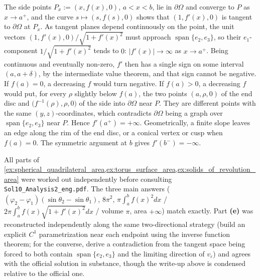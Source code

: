 \begin{exercisesolution}
\begin{enumerate}[label=\textbf{(\alph*)}]
    The side points $P_x := (x,f(x),0)$, $a<x<b$, lie in $\partial\Omega$ and converge to $P$ as
    $x \to a^+$, and the curve $s \mapsto (s,f(s),0)$ shows that $(1,f'(x),0)$ is tangent to
    $\partial\Omega$ at $P_x$. As tangent planes depend continuously on the point, the unit
    vectors $(1,f'(x),0)/\sqrt{1+f'(x)^2}$ must approach $\operatorname{span}\{e_2,e_3\}$, so
    their $e_1$-component $1/\sqrt{1+f'(x)^2}$ tends to $0$: $\lvert f'(x)\rvert \to \infty$ as
    $x \to a^+$. Being continuous and eventually non-zero, $f'$ then has a single sign on some
    interval $(a,a+\delta)$, by the intermediate value theorem, and that sign cannot be negative.
    If $f(a) = 0$, a decreasing $f$ would turn negative. If $f(a) > 0$, a decreasing $f$ would
    put, for every $\rho$ slightly below $f(a)$, the two points $(a,\rho,0)$ of the end disc and
    $\big(f^{-1}(\rho),\rho,0\big)$ of the side into $\partial\Omega$ near $P$. They are different
    points with the same $(y,z)$-coordinates, which contradicts $\partial\Omega$ being a graph over
    $\operatorname{span}\{e_2,e_3\}$ near $P$. Hence $f'(a^+)=+\infty$. Geometrically, a finite
    slope leaves an edge along the rim of the end disc, or a conical vertex or cusp when
    $f(a) = 0$. The symmetric argument at $b$ gives $f'(b^-)=-\infty$.
\end{enumerate}
\end{exercisesolution}

\begin{ainote}
All parts of \cref{ex:spherical_quadrilateral_area,ex:torus_surface_area,ex:solids_of_revolution_area} were worked out independently before consulting
\texttt{Sol10\_Analysis2\_eng.pdf}. The three main answers ($(\varphi_2-\varphi_1)(\sin\theta_2
-\sin\theta_1)$, $8\pi^2$, $\pi\int_a^bf(x)^2dx$ / $2\pi\int_a^bf(x)\sqrt{1+f'(x)^2}dx$ /
volume $\pi$, area $+\infty$) match exactly. Part \textbf{(e)} was reconstructed independently
along the same two-directional strategy (build an explicit $C^1$ parametrization near each
endpoint using the inverse function theorem; for the converse, derive a contradiction from the
tangent space being forced to both contain $\operatorname{span}\{e_2,e_3\}$ and the limiting
direction of $v_\varepsilon$) and agrees with the official solution in substance, though the
write-up above is condensed relative to the official one.
\end{ainote}

